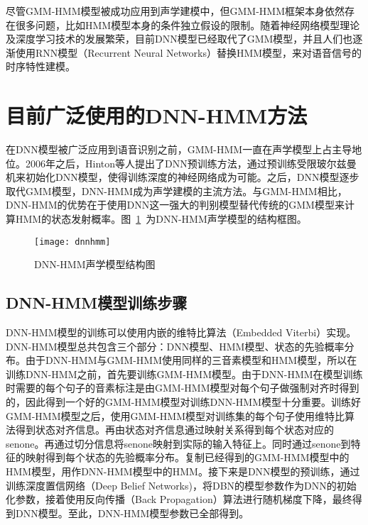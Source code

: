 尽管GMM-HMM模型被成功应用到声学建模中，但GMM-HMM框架本身依然存在很多问题，比如HMM模型本身的条件独立假设的限制。随着神经网络模型理论及深度学习技术的发展繁荣，目前DNN模型已经取代了GMM模型，并且人们也逐渐使用RNN模型（Recurrent Neural Networks）替换HMM模型，来对语音信号的时序特性建模。
\section{目前广泛使用的DNN-HMM方法}
在DNN模型被广泛应用到语音识别之前，GMM-HMM一直在声学模型上占主导地位。2006年之后，Hinton等人提出了DNN预训练方法，通过预训练受限玻尔兹曼机来初始化DNN模型，使得训练深度的神经网络成为可能。之后，DNN模型逐步取代GMM模型，DNN-HMM成为声学建模的主流方法。与GMM-HMM相比，DNN-HMM的优势在于使用DNN这一强大的判别模型替代传统的GMM模型来计算HMM的状态发射概率。图~\ref{fig:dnnhmm}~为DNN-HMM声学模型的结构框图。
\begin{figure}[htbp]
\centering
\texttt{[image: dnnhmm]}
\caption{DNN-HMM声学模型结构图\cite{yu2012automatic}}\label{fig:dnnhmm}
\vspace{\baselineskip}
\end{figure}
\subsection{DNN-HMM模型训练步骤}
DNN-HMM模型的训练可以使用内嵌的维特比算法（Embedded Viterbi）实现。DNN-HMM模型总共包含三个部分：DNN模型、HMM模型、状态的先验概率分布。由于DNN-HMM与GMM-HMM使用同样的三音素模型和HMM模型，所以在训练DNN-HMM之前，首先要训练GMM-HMM模型。由于DNN-HMM在模型训练时需要的每个句子的音素标注是由GMM-HMM模型对每个句子做强制对齐时得到的，因此得到一个好的GMM-HMM模型对训练DNN-HMM模型十分重要。训练好GMM-HMM模型之后，使用GMM-HMM模型对训练集的每个句子使用维特比算法得到状态对齐信息。再由状态对齐信息通过映射关系得到每个状态对应的senone。再通过切分信息将senone映射到实际的输入特征上。同时通过senone到特征的映射得到每个状态的先验概率分布。复制已经得到的GMM-HMM模型中的HMM模型，用作DNN-HMM模型中的HMM。接下来是DNN模型的预训练，通过训练深度置信网络（Deep Belief Networks)，将DBN的模型参数作为DNN的初始化参数，接着使用反向传播（Back Propagation）算法进行随机梯度下降，最终得到DNN模型。至此，DNN-HMM模型参数已全部得到。
